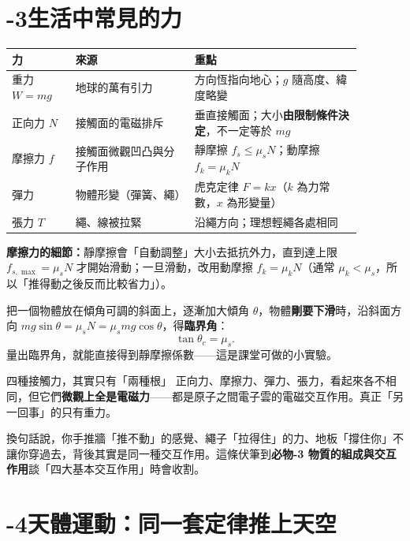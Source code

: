 \documentclass[11pt]{article}
\begin{document}
\section*{-3\quad 生活中常見的力}

\begin{center}
\renewcommand{\arraystretch}{1.3}
\begin{tabular}{p{0.16\linewidth} p{0.30\linewidth} p{0.42\linewidth}}
\hline
\textbf{力} & \textbf{來源} & \textbf{重點} \\
\hline
重力 $W=mg$ & 地球的萬有引力 & 方向恆指向地心；$g$ 隨高度、緯度略變 \\
正向力 $N$ & 接觸面的電磁排斥 & 垂直接觸面；大小\textbf{由限制條件決定}，不一定等於 $mg$ \\
摩擦力 $f$ & 接觸面微觀凹凸與分子作用 & 靜摩擦 $f_s\le\mu_s N$；動摩擦 $f_k=\mu_k N$ \\
彈力 & 物體形變（彈簧、繩） & 虎克定律 $F=kx$（$k$ 為力常數，$x$ 為形變量） \\
張力 $T$ & 繩、線被拉緊 & 沿繩方向；理想輕繩各處相同 \\
\hline
\end{tabular}
\end{center}

\textbf{摩擦力的細節：}靜摩擦會「自動調整」大小去抵抗外力，直到達上限 $f_{s,\max}=\mu_s N$ 才開始滑動；一旦滑動，改用動摩擦 $f_k=\mu_k N$（通常 $\mu_k<\mu_s$，所以「推得動之後反而比較省力」）。

把一個物體放在傾角可調的斜面上，逐漸加大傾角 $\theta$，物體\textbf{剛要下滑}時，沿斜面方向 $mg\sin\theta = \mu_s N = \mu_s mg\cos\theta$，得\textbf{臨界角}：
$$\tan\theta_c = \mu_s.$$
量出臨界角，就能直接得到靜摩擦係數——這是課堂可做的小實驗。


\begin{補充框}{四種接觸力，其實只有「兩種根」}
正向力、摩擦力、彈力、張力，看起來各不相同，但它們\textbf{微觀上全是電磁力}——都是原子之間電子雲的電磁交互作用。真正「另一回事」的只有重力。

換句話說，你手推牆「推不動」的感覺、繩子「拉得住」的力、地板「撐住你」不讓你穿過去，背後其實是同一種交互作用。這條伏筆到\textbf{必物-3 物質的組成與交互作用}談「四大基本交互作用」時會收割。
\end{補充框}

\section*{-4\quad 天體運動：同一套定律推上天空}
\end{document}
